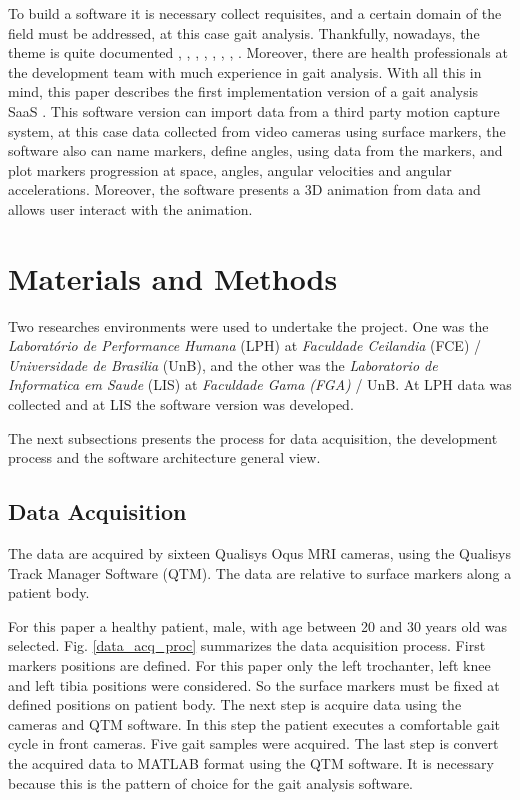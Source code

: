 \documentclass[journal]{IEEEtran}
\begin{document}
To build a software it is necessary collect requisites, and a certain domain
of the field must be addressed, at this case gait analysis. 
Thankfully, nowadays, the theme is quite documented
\cite{Perry2010}, \cite{Whittle2012}, \cite{Ferreira2009}, \cite{Vieira2015}, 
\cite{Duhamel2004}, \cite{Ghoussayni2004}, \cite{Moreno2009}, \cite{Beynon2010}. 
Moreover, there are health professionals at the development team with much
experience in gait analysis. With all this in mind, this paper describes the
first implementation version of a gait analysis SaaS \cite{Lima2015}.
This software version can import data from a third party motion capture system, at this
case data collected from video cameras using surface markers, the software
also can name markers, define angles, using data from the markers, and plot 
markers progression at space, angles, angular velocities and angular accelerations.
Moreover, the software presents a 3D animation from data and allows user 
interact with the animation.



\section{Materials and Methods}

Two researches environments were used to undertake the project. 
One was the \emph{Laboratório de Performance Humana} (LPH) at 
\emph{Faculdade Ceilandia} (FCE) / \emph{Universidade de Brasilia} (UnB), 
and the other was the \emph{Laboratorio de Informatica em Saude} (LIS)
at \emph{Faculdade Gama (FGA)} / UnB. At LPH data was collected and at
LIS the software version was developed.

The next subsections presents the process for data acquisition,
the development process and the software architecture general
view.

\subsection{Data Acquisition}

The data are acquired by sixteen Qualisys Oqus MRI cameras, using
the Qualisys Track Manager Software (QTM). 
The data are relative to surface markers along a patient body.

For this paper a healthy patient, male, with age between 20 and 30 years old
was selected.
Fig. \ref{data_acq_proc} summarizes the data acquisition process.
First   markers positions are defined. 
For this paper only the left trochanter, left knee and left tibia
positions were considered. 
So the surface markers must be fixed at defined positions on patient body.
The next step is acquire data using the cameras and QTM software. In this
step the patient executes a comfortable gait cycle in front cameras.
Five gait samples were acquired.
The last step is convert the acquired data to MATLAB format using the QTM
software. It is necessary because this is the pattern of choice for 
the gait analysis software.
\end{document}
